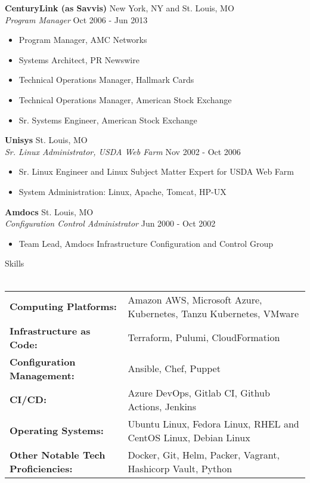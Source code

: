 \documentclass[letterpaper]{article}
\newcommand{\lineunder} {
    \vspace*{-8pt} \\
    \hspace*{-18pt} \hrulefill \\
}
\newcommand{\header} [1] {
    {\hspace*{-18pt}\vspace*{6pt} #1}
    \vspace*{-6pt} \lineunder
}
\begin{document}
\textbf{CenturyLink (as Savvis)} \hfill New York, NY and St. Louis, MO\\
\textit{Program Manager} \hfill Oct 2006 - Jun 2013\\
\vspace{-1mm}
\begin{itemize} \itemsep 1pt
	\item Program Manager, AMC Networks
	\item Systems Architect, PR Newswire
	\item Technical Operations Manager, Hallmark Cards
	\item Technical Operations Manager, American Stock Exchange
	\item Sr. Systems Engineer, American Stock Exchange
\end{itemize}
\textbf{Unisys} \hfill St. Louis, MO\\
\textit{Sr. Linux Administrator, USDA Web Farm} \hfill Nov 2002 - Oct 2006\\
\vspace{-1mm}
\begin{itemize} \itemsep 1pt
	\item Sr. Linux Engineer and Linux Subject Matter Expert for USDA Web Farm
	\item System Administration: Linux, Apache, Tomcat, HP-UX
\end{itemize}
\textbf{Amdocs} \hfill St. Louis, MO\\
\textit{Configuration Control Administrator} \hfill Jun 2000 - Oct 2002\\
\vspace{-1mm}
\begin{itemize} \itemsep 1pt
	\item Team Lead, Amdocs Infrastructure Configuration and Control Group
\end{itemize}

\header{Skills}
\begin{tabular}{ l l }
  \textbf{Computing Platforms:}              & Amazon AWS, Microsoft Azure, Kubernetes, Tanzu Kubernetes, VMware \\
  \textbf{Infrastructure as Code:}           & Terraform, Pulumi, CloudFormation                                 \\
  \textbf{Configuration Management:}         & Ansible, Chef, Puppet                                             \\
  \textbf{CI/CD:}                            & Azure DevOps, Gitlab CI, Github Actions, Jenkins                  \\
  \textbf{Operating Systems:}                & Ubuntu Linux, Fedora Linux, RHEL and CentOS Linux, Debian Linux   \\
  \textbf{Other Notable Tech Proficiencies:} & Docker, Git, Helm, Packer, Vagrant, Hashicorp Vault, Python       \\
\end{tabular}
\vspace{2mm}
\end{document}
